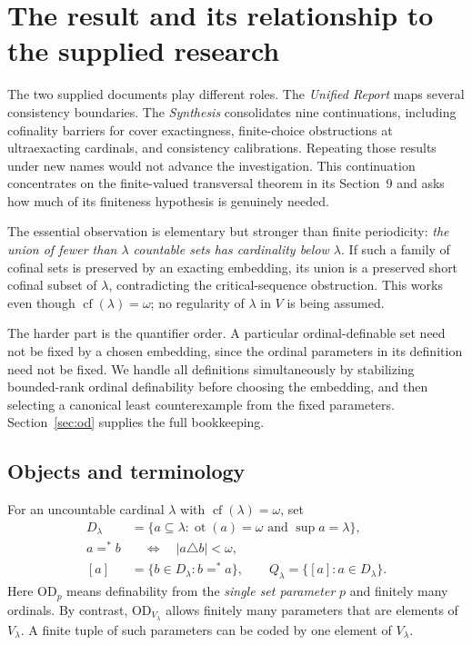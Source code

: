\documentclass[11pt,letterpaper]{article}
\theoremstyle{definition}
\newcommand{\OD}{\mathrm{OD}}
\newcommand{\cf}{\operatorname{cf}}
\newcommand{\ot}{\operatorname{ot}}
\numberwithin{equation}{section}
\newcommand{\eqfin}{\mathrel{=^{*}}}
\begin{document}
\newpage
\tableofcontents

\newpage
\section{The result and its relationship to the supplied research}\label{sec:overview}

The two supplied documents play different roles. The \emph{Unified Report}
\cite{unified} maps several consistency boundaries. The \emph{Synthesis}
\cite{synthesis} consolidates nine continuations, including cofinality barriers
for cover exactingness, finite-choice obstructions at ultraexacting cardinals,
and consistency calibrations. Repeating those results under new names would not
advance the investigation. This continuation concentrates on the finite-valued
transversal theorem in its Section~9 and asks how much of its finiteness
hypothesis is genuinely needed.

The essential observation is elementary but stronger than finite periodicity:
\emph{the union of fewer than $\lambda$ countable sets has cardinality below
$\lambda$}. If such a family of cofinal sets is preserved by an exacting
embedding, its union is a preserved short cofinal subset of $\lambda$,
contradicting the critical-sequence obstruction. This works even though
$\cf(\lambda)=\omega$; no regularity of $\lambda$ in $V$ is being assumed.

The harder part is the quantifier order. A particular ordinal-definable set
need not be fixed by a chosen embedding, since the ordinal parameters in its
definition need not be fixed. We handle all definitions simultaneously by
stabilizing bounded-rank ordinal definability before choosing the embedding,
and then selecting a canonical least counterexample from the fixed parameters.
Section~\ref{sec:od} supplies the full bookkeeping.

\subsection{Objects and terminology}

For an uncountable cardinal $\lambda$ with $\cf(\lambda)=\omega$, set
\begin{align}
 D_\lambda&=\{a\subseteq\lambda:\ot(a)=\omega\text{ and }\sup a=\lambda\},\\
 a\eqfin b&\quad\Longleftrightarrow\quad |a\triangle b|<\omega,\\
 [a]&=\{b\in D_\lambda:b\eqfin a\},\qquad
 Q_\lambda=\{[a]:a\in D_\lambda\}.
\end{align}
Here $\OD_p$ means definability from the \emph{single set parameter} $p$ and
finitely many ordinals. By contrast, $\OD_{V_\lambda}$ allows finitely many
parameters that are elements of $V_\lambda$. A finite tuple of such parameters
can be coded by one element of $V_\lambda$.
\end{document}
